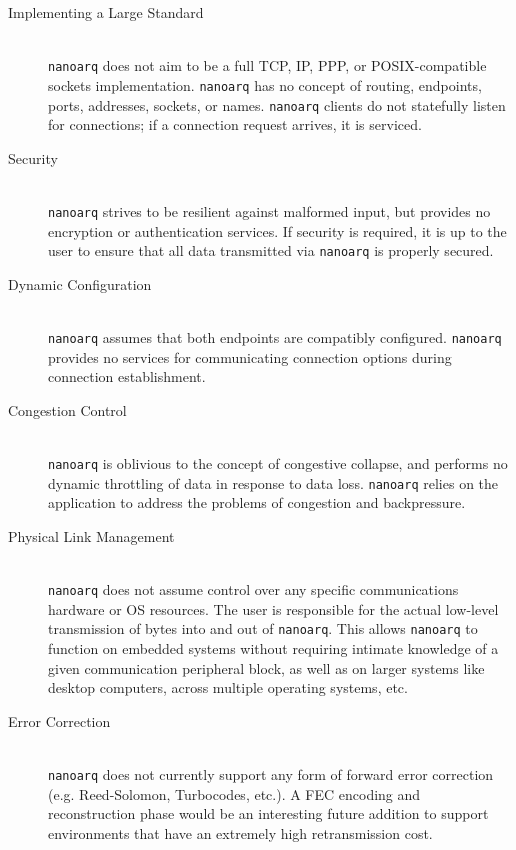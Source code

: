 \documentclass[11pt]{article}
\newcommand{\nanoarq}{\texttt{nanoarq}}
\begin{document}
\begin{description}
\item[Implementing a Large Standard] \hfill \\
    \nanoarq{} does not aim to be a full TCP, IP, PPP, or POSIX-compatible sockets implementation. \nanoarq{} has no concept of routing, endpoints, ports, addresses, sockets, or names. \nanoarq{} clients do not statefully listen for connections; if a connection request arrives, it is serviced.

\item[Security] \hfill \\
    \nanoarq{} strives to be resilient against malformed input, but provides no encryption or authentication services. If security is required, it is up to the user to ensure that all data transmitted via \nanoarq{} is properly secured.

\item[Dynamic Configuration] \hfill \\
    \nanoarq{} assumes that both endpoints are compatibly configured. \nanoarq{} provides no services for communicating connection options during connection establishment.

\item[Congestion Control] \hfill \\
    \nanoarq{} is oblivious to the concept of congestive collapse, and performs no dynamic throttling of data in response to data loss. \nanoarq{} relies on the application to address the problems of congestion and backpressure.

\item[Physical Link Management] \hfill \\
    \nanoarq{} does not assume control over any specific communications hardware or OS resources. The user is responsible for the actual low-level transmission of bytes into and out of \nanoarq{}. This allows \nanoarq{} to function on embedded systems without requiring intimate knowledge of a given communication peripheral block, as well as on larger systems like desktop computers, across multiple operating systems, etc.

\item[Error Correction] \hfill \\
    \nanoarq{} does not currently support any form of forward error correction (e.g. Reed-Solomon, Turbocodes, etc.). A FEC encoding and reconstruction phase would be an interesting future addition to support environments that have an extremely high retransmission cost.
\end{description}
\end{document}
